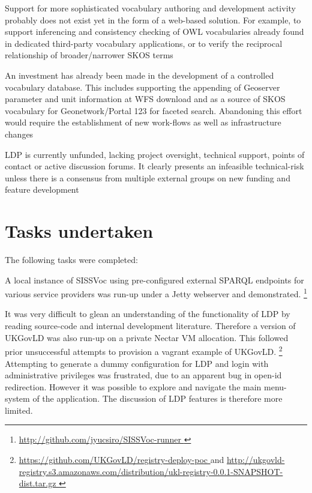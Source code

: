 \documentclass[10pt,a4paper]{article}
\begin{document}
\begin{flushleft}
\item[] Support for more sophisticated vocabulary authoring and development 
activity probably does not exist yet in the form of a web-based solution. For 
example, to support inferencing and consistency checking of OWL vocabularies already 
found in dedicated third-party vocabulary applications, or to verify the 
reciprocal relationship of broader/narrower SKOS terms
\item[] An investment has already been made in the development of a controlled vocabulary 
database. This includes supporting the appending of Geoserver parameter and 
unit information at WFS download and 
as a source of SKOS vocabulary for Geonetwork/Portal 123 for faceted search. 
Abandoning this effort would require the establishment of new work-flows as well as infrastructure
changes
\item[] LDP is currently unfunded, lacking project oversight, technical 
support, points of contact or active discussion forums. It clearly presents an infeasible technical-risk 
unless there is a consensus from multiple external groups on new funding and 
feature development 


\clearpage



\section{
  Tasks undertaken
}

%  
  The following tasks were completed:  

    \item[] A local instance of SISSVoc using pre-configured external SPARQL
  endpoints for various service providers was run-up under a Jetty webserver and
  demonstrated.  \footnote{ \url {
  http://github.com/jyucsiro/SISSVoc-runner }  } 

    \item[] It was very difficult to glean an understanding of the
  functionality of LDP by reading source-code and internal development
  literature. Therefore a version of UKGovLD was also run-up on a private Nectar
  VM allocation. This followed prior unsuccessful attempts to provision a vagrant
  example of UKGovLD.  \footnote{ \url {
  https://github.com/UKGovLD/registry-deploy-poc } and \url {
  http://ukgovld-registry.s3.amazonaws.com/distribution/ukl-registry-0.0.1-SNAPSHOT-dist.tar.gz
  } }
    Attempting to generate a dummy configuration for LDP and login with
  administrative privileges was frustrated, due to an apparent bug in open-id redirection.
  However it was possible to explore and navigate the main menu-system of the
  application.
    The discussion of LDP features is therefore more limited.


\end{flushleft}
\end{document}
